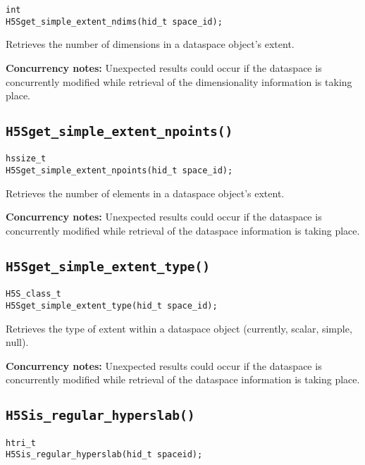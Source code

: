 \documentclass[../HDF5_RFC.tex]{subfiles}
\begin{document}
\begin{verbatim}
int
H5Sget_simple_extent_ndims(hid_t space_id);
\end{verbatim}

Retrieves the number of dimensions in a dataspace object's extent.

\textbf{Concurrency notes:} Unexpected results could occur if the dataspace is concurrently modified
while retrieval of the dimensionality information is taking place.

\subsection{\texttt{H5Sget\_simple\_extent\_npoints()}}
\label{apdx:h5s_func_h5sget_simple_extent_npoints}

\begin{verbatim}
hssize_t
H5Sget_simple_extent_npoints(hid_t space_id);
\end{verbatim}

Retrieves the number of elements in a dataspace object's extent.

\textbf{Concurrency notes:} Unexpected results could occur if the dataspace is concurrently modified
while retrieval of the dataspace information is taking place.

\subsection{\texttt{H5Sget\_simple\_extent\_type()}}
\label{apdx:h5s_func_h5sget_simple_extent_type}

\begin{verbatim}
H5S_class_t
H5Sget_simple_extent_type(hid_t space_id);
\end{verbatim}

Retrieves the type of extent within a dataspace object (currently, scalar, simple, null).

\textbf{Concurrency notes:} Unexpected results could occur if the dataspace is concurrently modified
while retrieval of the dataspace information is taking place.

\subsection{\texttt{H5Sis\_regular\_hyperslab()}}
\label{apdx:h5s_func_h5sis_regular_hyperslab}

\begin{verbatim}
htri_t
H5Sis_regular_hyperslab(hid_t spaceid);
\end{verbatim}
\end{document}
